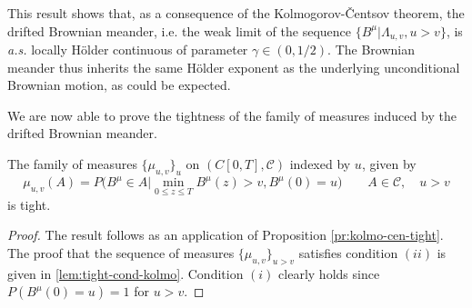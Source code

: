 \begin{remark}
	This result shows that, as a consequence of the Kolmogorov-\v Centsov theorem, the drifted Brownian meander, i.e. the weak limit of the sequence $ \{ B^\mu | \Lambda_{u,v} , u >v \} $, is \emph{a.s.} locally H\"older continuous of parameter $\gamma \in (0, 1/2)$. The Brownian meander thus inherits the same H\"older exponent as
	the underlying  unconditional Brownian motion, as could be expected. 
\end{remark}


We are now able to prove the tightness of the family of measures induced by the drifted 
Brownian meander. 

\begin{theorem}\label{thm:tight-bmd}
	The family of measures $ \{\mu_{u,v} \}_u $ on $ (C[0,T], \mathscr C) $ indexed by $ u$, given by
	\[
	\mu_{u,v}(A) = P\Big(B^\mu \in A \Big | \min_{0\leq z\leq T} B^\mu(z) > v, B^\mu(0) = u\Big ) \qquad A \in \mathscr C, \quad u>v
	\]
	is tight. 
\end{theorem}
\begin{proof}
	The result follows as an application of Proposition \autoref{pr:kolmo-cen-tight}. 
	The proof that the  sequence of measures $ \{ \mu_{u,v}\}_{u > v} $ satisfies condition 
	$ (ii) $ is given in 
	\autoref{lem:tight-cond-kolmo}. Condition $ (i) $ clearly holds since
	$ P(B^\mu(0) = u) = 1 $ for $ u > v  $. 
	
\end{proof}

